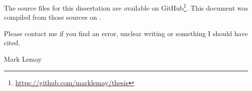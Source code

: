The source files for this dissertation are available on GitHub\footnote{\url{https://github.com/marklemay/thesis}}.
This document was compiled from those sources on \DTMnow. %
 
Please contact me if you find an error, unclear writing or something I should have cited.

\hfill{Mark Lemay}

